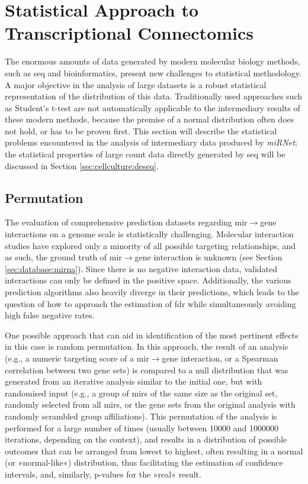 \section{Statistical Approach to Transcriptional Connectomics}
The enormous amounts of data generated by modern molecular biology methods, such as \ac{seq} and bioinformatics, present new challenges to statistical methodology. A major objective in the analysis of large datasets is a robust statistical representation of the distribution of this data. Traditionally used approaches such as Student's t-test are not automatically applicable to the intermediary results of these modern methods, because the premise of a normal distribution often does not hold, or has to be proven first. This section will describe the statistical problems encountered in the analysis of intermediary data produced by \textit{miRNet}; the statistical properties of large count data directly generated by \ac{seq} will be discussed in Section \ref{sec:cellculture:deseq}.

\subsection{Permutation}
The evaluation of comprehensive prediction datasets regarding \ac{mir}$\to$gene interactions on a genome scale is statistically challenging. Molecular interaction studies have explored only a minority of all possible targeting relationships, and as such, the ground truth of \ac{mir}$\to$gene interaction is unknown (see Section \ref{sec:database:mirna}). Since there is no negative interaction data, validated interactions can only be defined in the positive space. Additionally, the various prediction algorithms also heavily diverge in their predictions, which leads to the question of how to approach the estimation of \acf{fdr} while simultaneously avoiding high false negative rates.

One possible approach that can aid in identification of the most pertinent effects in this case is random permutation. In this approach, the result of an analysis (e.g., a numeric targeting score of a \ac{mir}$\to$gene interaction, or a Spearman correlation between two gene sets) is compared to a null distribution that was generated from an iterative analysis similar to the initial one, but with randomised input (e.g., a group of \acp{mir} of the same size as the original set, randomly selected from all \acp{mir}, or the gene sets from the original analysis with randomly scrambled group affiliations). This permutation of the analysis is performed for a large number of times (usually between \num{10000} and \num{1000000} iterations, depending on the context), and results in a distribution of possible outcomes that can be arranged from lowest to highest, often resulting in a normal (or »normal-like«) distribution, thus facilitating the estimation of confidence intervals, and, similarly, p-values for the »real« result.

